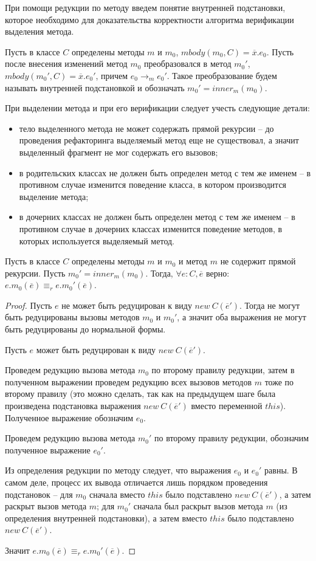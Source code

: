 При помощи редукции по методу введем понятие внутренней подстановки, которое необходимо для доказательства корректности алгоритма верификации выделения метода.
\begin{definition}
Пусть в классе $C$ определены методы $m$ и $m_0$, $mbody(m_0, C) = \overline{x}.e_0$.
Пусть после внесения изменений метод $m_0$ преобразовался в метод $m_0'$, $mbody(m_0', C) = \overline{x}.e_0'$, причем $e_0 \rightarrow_m e_0'$.
Такое преобразование будем называть внутренней подстановкой и обозначать $m_0' = inner_m(m_0)$.
\end{definition}

При выделении метода и при его верификации следует учесть следующие детали:
\begin{itemize}
    \item тело выделенного метода не может содержать прямой рекурсии -- до проведения рефакторинга выделяемый метод еще не существовал, а значит выделенный фрагмент не мог содержать его вызовов;
    \item в родительских классах не должен быть определен метод с тем же именем -- в противном случае изменится поведение класса, в котором производится выделение метода;
    \item в дочерних классах не должен быть определен метод с тем же именем -- в противном случае в дочерних классах изменится поведение методов, в которых используется выделяемый метод.
\end{itemize}

\begin{theorem}
Пусть в классе $C$ определены методы $m$ и $m_0$ и метод $m$ не содержит прямой рекурсии. Пусть $m_0' = inner_m(m_0)$.
Тогда, $\forall e : C, \overline{e}$ верно: $e.m_0(\overline{e}) \equiv_r e.m_0'(\overline{e})$.
\end{theorem}
\begin{proof}
Пусть $e$ не может быть редуцирован к виду $new\ C(\overline{e}')$. Тогда не могут быть редуцированы вызовы методов $m_0$ и $m_0'$, а значит оба выражения не могут быть редуцированы до нормальной формы.

Пусть $e$ может быть редуцирован к виду $new\ C(\overline{e}')$.

Проведем редукцию вызова метода $m_0$ по второму правилу редукции, затем в полученном выражении проведем редукцию всех вызовов методов $m$ тоже по второму правилу
(это можно сделать, так как на предыдущем шаге была произведена подстановка выражения $new\ C(\overline{e}')$ вместо переменной $this$). Полученное выражение обозначим $e_0$.

Проведем редукцию вызова метода $m_0'$ по второму правилу редукции, обозначим полученное выражение $e_0'$.

Из определения редукции по методу следует, что выражения $e_0$ и $e_0'$ равны.
В самом деле, процесс их вывода отличается лишь порядком проведения подстановок -- для $m_0$ сначала вместо $this$ было подставлено $new\ C(\overline{e}')$, а затем раскрыт вызов метода $m$;
для $m_0'$ сначала был раскрыт вызов метода $m$ (из определения внутренней подстановки), а затем вместо $this$ было подставлено $new\ C(\overline{e}')$.

Значит $e.m_0(\overline{e}) \equiv_r e.m_0'(\overline{e})$.
\end{proof}
